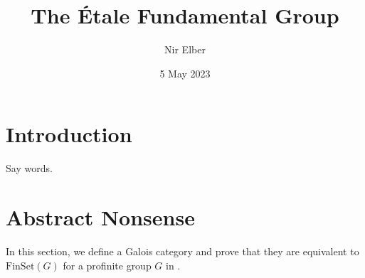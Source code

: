 \documentclass{amsart}
\title{The \'Etale Fundamental Group}
\author{Nir Elber}
\date{5 May 2023}
\begin{document}

\maketitle

\setcounter{tocdepth}{2}
\tableofcontents

\section{Introduction}
Say words.\todo{}

\section{Abstract Nonsense}
In this section, we define a Galois category and prove that they are equivalent to $\mathrm{FinSet}(G)$ for a profinite group $G$ in .
\end{document}
